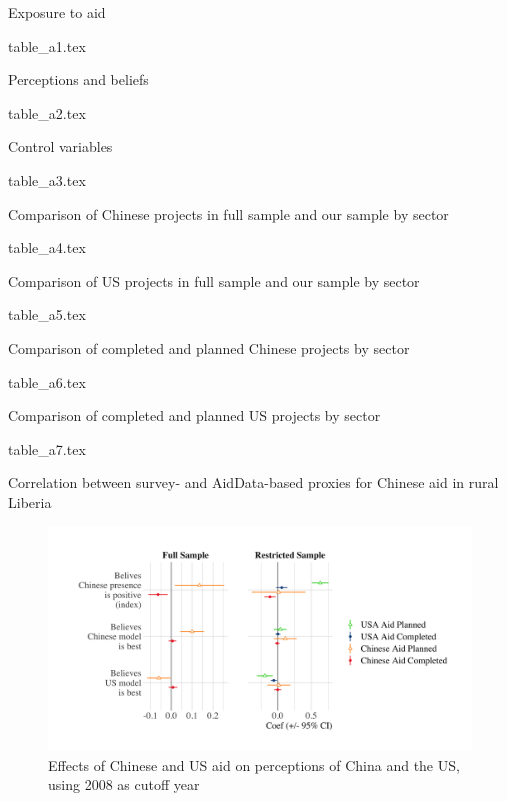 \documentclass[9pt]{article}
\begin{document}
\setlength{\tabcolsep}{5pt}
\begin{table}[H]
\caption{Exposure to aid}
\label{reg}
\centering
{table_a1.tex}
\end{table}

\setlength{\tabcolsep}{5pt}
\begin{table}[H]
\caption{Perceptions and beliefs}
\label{reg}
\centering
{table_a2.tex}
\end{table}

\setlength{\tabcolsep}{5pt}
\begin{table}[H]
\caption{Control variables}
\label{reg}
\centering
{table_a3.tex}
\end{table}

\setlength{\tabcolsep}{5pt}
\begin{table}[H]
\caption{Comparison of Chinese projects in full sample and our sample by sector}
\label{reg}
\centering
{table_a4.tex}
\end{table}

\setlength{\tabcolsep}{5pt}
\begin{table}[H]
\caption{Comparison of US projects in full sample and our sample by sector}
\label{reg}
\centering
{table_a5.tex}
\end{table}

\setlength{\tabcolsep}{5pt}
\begin{table}[H]
\caption{Comparison of completed and planned Chinese projects by sector}
\label{reg}
\centering
{table_a6.tex}
\end{table}

\setlength{\tabcolsep}{5pt}
\begin{table}[H]
\caption{Comparison of completed and planned US projects by sector}
\label{reg}
\centering
{table_a7.tex}
\end{table}

\setlength{\tabcolsep}{5pt}
\begin{table}[H]
\caption{Correlation between survey- and AidData-based proxies for Chinese aid in rural Liberia}
\label{reg}
\centering
\end{table}

\begin{figure}[H]
\centering
\caption{Effects of Chinese and US aid on perceptions of China and the US, using 2008 as cutoff year}
\includegraphics[width=1\textwidth]{figures/figure_a4.png}
\end{figure}
\end{document}
